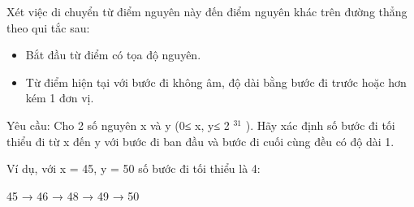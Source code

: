 Xét việc di chuyển từ điểm nguyên này đến điểm nguyên khác trên đường thẳng theo qui tắc sau:  
\begin{itemize}
	\item     Bắt đầu từ điểm có tọa độ nguyên.   
	\item     Từ điểm hiện tại với bước đi không âm, độ dài bằng bước đi trước hoặc hơn kém 1 đơn vị.   
\end{itemize}

   Yêu cầu: Cho 2 số nguyên x và y (0≤ x, y≤ 2   $^    31   $   ). Hãy xác định số bước đi tối thiểu đi từ x đến y với   bước đi ban đầu và bước đi cuối cùng đều có độ dài 1.  

   Ví dụ, với x = 45, y = 50 số bước đi tối thiểu là 4:  

   45 → 46 → 48 → 49 → 50